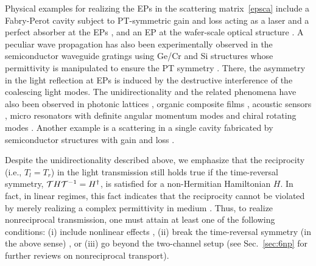 \documentclass{tADP2e}
\theoremstyle{plain}
\theoremstyle{plain}
\theoremstyle{definition}
\begin{document}
{Physical examples for realizing the EPs in the scattering matrix~\eqref{epsca} include a Fabry-Perot cavity subject to PT-symmetric gain and loss acting as a laser and a perfect absorber at the EPs \cite{LS102,CYD11}, and an EP at the wafer-scale optical structure \cite{LF142}. A peculiar wave propagation has  also been  experimentally observed in the semiconductor waveguide gratings using Ge/Cr and Si structures whose permittivity is manipulated to ensure the PT symmetry \cite{LF13}. There, the asymmetry in the light reflection at EPs is induced by the destructive interference of the coalescing light modes. The unidirectionality and the related phenomena  have also been observed in photonic lattices \cite{RA12pt}, organic composite films \cite{YY142}, acoustic sensors \cite{FR15}, micro resonators with definite angular momentum modes \cite{MP16} and chiral rotating modes \cite{WJ11,MK14,PB16}. 
Another example is a scattering in a single cavity fabricated by semiconductor structures with gain and loss \cite{WZ16}. 


Despite the unidirectionality described above, we emphasize that the reciprocity (i.e., $T_l=T_r$) in the light transmission still holds true if the time-reversal symmetry, ${\cal T}H{\cal T}^{-1}=H^\dagger$, is satisfied for a non-Hermitian Hamiltonian $H$. In fact, in linear regimes, this fact indicates that the reciprocity cannot be violated by merely realizing a complex permittivity in medium  \cite{JGM04,AZ01}. Thus, to realize nonreciprocal transmission, one must attain at least one of the following conditions: (i) include nonlinear effects \cite{BP14}, (ii) break the time-reversal symmetry (in the above sense) \cite{BM19}, or (iii) go beyond the two-channel setup \cite{Fleury516}  (see Sec.~\ref{sec:6np} for further reviews on nonreciprocal transport). 
}
\end{document}
